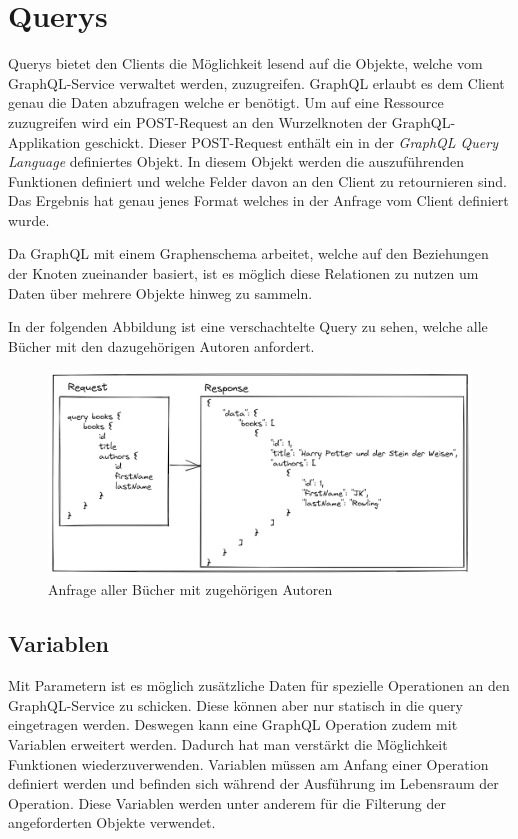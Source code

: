 \section{Querys}

Querys bietet den Clients die Möglichkeit lesend auf die Objekte, welche vom GraphQL-Service verwaltet werden, zuzugreifen.
GraphQL erlaubt es dem Client genau die Daten abzufragen welche er benötigt.
Um auf eine Ressource zuzugreifen wird ein POST-Request an den Wurzelknoten der GraphQL-Applikation geschickt.
Dieser POST-Request enthält ein in der \textit{GraphQL Query Language} definiertes Objekt.
In diesem Objekt werden die auszuführenden Funktionen definiert und welche Felder davon an den Client zu retournieren sind.
Das Ergebnis hat genau jenes Format welches in der Anfrage vom Client definiert wurde.

Da GraphQL mit einem Graphenschema arbeitet, welche auf den Beziehungen der Knoten zueinander basiert, ist es möglich diese Relationen zu nutzen um Daten über mehrere Objekte hinweg zu sammeln.
\newline


In der folgenden Abbildung ist eine verschachtelte Query zu sehen, welche alle Bücher mit den dazugehörigen Autoren anfordert.

\begin{figure}[H]
    \includegraphics[width=\textwidth]{pics/query_book_with_result.png}
    \caption{Anfrage aller Bücher mit zugehörigen Autoren}
\end{figure}

\subsection{Variablen}
Mit Parametern ist es möglich zusätzliche Daten für spezielle Operationen an den GraphQL-Service zu schicken.
Diese können aber nur statisch in die query eingetragen werden.
Deswegen kann eine GraphQL Operation zudem mit Variablen erweitert werden.
Dadurch hat man verstärkt die Möglichkeit Funktionen wiederzuverwenden.
Variablen müssen am Anfang einer Operation definiert werden und befinden sich während der Ausführung im Lebensraum der Operation.
Diese Variablen werden unter anderem für die Filterung der angeforderten Objekte verwendet.
\newline

